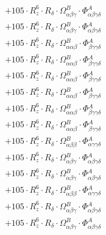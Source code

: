 \documentclass{article}
\begin{document}
\begin{subequations}
\begin{gather}
\begin{array}{c}
 \\[0.2em] 		 + 105 \cdot R_{z}^{6} \cdot R_{\delta{}} \cdot \Omega{}^{B}_{\alpha{}\beta{}\gamma{}} \cdot \Phi{}^{A}_{\alpha{}\beta{}\gamma{}\delta{}} 
 \\[0.2em] 		 + 105 \cdot R_{z}^{6} \cdot R_{\delta{}} \cdot \Omega{}^{B}_{\alpha{}\beta{}\gamma{}} \cdot \Phi{}^{A}_{\alpha{}\beta{}\gamma{}\delta{}} 
 \\[0.2em] 		 + 105 \cdot R_{z}^{6} \cdot R_{\delta{}} \cdot \Omega{}^{B}_{\alpha{}\alpha{}\beta{}} \cdot \Phi{}^{A}_{\beta{}\gamma{}\gamma{}\delta{}} 
 \\[0.2em] 		 + 105 \cdot R_{z}^{6} \cdot R_{\delta{}} \cdot \Omega{}^{B}_{\alpha{}\alpha{}\beta{}} \cdot \Phi{}^{A}_{\beta{}\gamma{}\gamma{}\delta{}} 
 \\[0.2em] 		 + 105 \cdot R_{z}^{6} \cdot R_{\delta{}} \cdot \Omega{}^{B}_{\alpha{}\alpha{}\beta{}} \cdot \Phi{}^{A}_{\beta{}\gamma{}\gamma{}\delta{}} 
 \\[0.2em] 		 + 105 \cdot R_{z}^{6} \cdot R_{\delta{}} \cdot \Omega{}^{B}_{\alpha{}\alpha{}\beta{}} \cdot \Phi{}^{A}_{\beta{}\gamma{}\gamma{}\delta{}} 
 \\[0.2em] 		 + 105 \cdot R_{z}^{6} \cdot R_{\delta{}} \cdot \Omega{}^{B}_{\alpha{}\alpha{}\beta{}} \cdot \Phi{}^{A}_{\beta{}\gamma{}\gamma{}\delta{}} 
 \\[0.2em] 		 + 105 \cdot R_{z}^{6} \cdot R_{\delta{}} \cdot \Omega{}^{B}_{\alpha{}\alpha{}\beta{}} \cdot \Phi{}^{A}_{\beta{}\gamma{}\gamma{}\delta{}} 
 \\[0.2em] 		 + 105 \cdot R_{z}^{6} \cdot R_{\delta{}} \cdot \Omega{}^{B}_{\alpha{}\beta{}\beta{}} \cdot \Phi{}^{A}_{\alpha{}\gamma{}\gamma{}\delta{}} 
 \\[0.2em] 		 + 105 \cdot R_{z}^{6} \cdot R_{\delta{}} \cdot \Omega{}^{B}_{\alpha{}\beta{}\gamma{}} \cdot \Phi{}^{A}_{\alpha{}\beta{}\gamma{}\delta{}} 
 \\[0.2em] 		 + 105 \cdot R_{z}^{6} \cdot R_{\delta{}} \cdot \Omega{}^{B}_{\alpha{}\beta{}\gamma{}} \cdot \Phi{}^{A}_{\alpha{}\beta{}\gamma{}\delta{}} 
 \\[0.2em] 		 + 105 \cdot R_{z}^{6} \cdot R_{\delta{}} \cdot \Omega{}^{B}_{\alpha{}\beta{}\beta{}} \cdot \Phi{}^{A}_{\alpha{}\gamma{}\gamma{}\delta{}} 
 \\[0.2em] 		 + 105 \cdot R_{z}^{6} \cdot R_{\delta{}} \cdot \Omega{}^{B}_{\alpha{}\beta{}\gamma{}} \cdot \Phi{}^{A}_{\alpha{}\beta{}\gamma{}\delta{}} 
 \\[0.2em] 		 + 105 \cdot R_{z}^{6} \cdot R_{\delta{}} \cdot \Omega{}^{B}_{\alpha{}\beta{}\gamma{}} \cdot \Phi{}^{A}_{\alpha{}\beta{}\gamma{}\delta{}} 

\end{array}
\end{gather}
\end{subequations}
\end{document}
